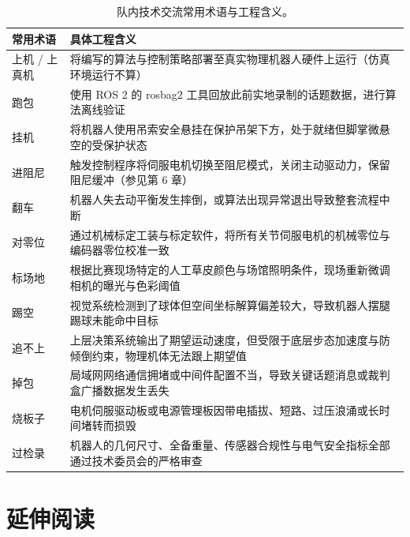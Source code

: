 \begin{table}[H]
\centering
\small
\begin{tabularx}{\textwidth}{p{2.6cm} X}
\toprule
\textbf{常用术语} & \textbf{具体工程含义} \\
\midrule
上机 / 上真机 & 将编写的算法与控制策略部署至真实物理机器人硬件上运行（仿真环境运行不算） \\
\addlinespace
跑包 & 使用 ROS 2 的 rosbag2 工具回放此前实地录制的话题数据，进行算法离线验证 \\
\addlinespace
挂机 & 将机器人使用吊索安全悬挂在保护吊架下方，处于就绪但脚掌微悬空的受保护状态 \\
\addlinespace
进阻尼 & 触发控制程序将伺服电机切换至阻尼模式，关闭主动驱动力，保留阻尼缓冲（参见第 6 章） \\
\addlinespace
翻车 & 机器人失去动平衡发生摔倒，或算法出现异常退出导致整套流程中断 \\
\addlinespace
对零位 & 通过机械标定工装与标定软件，将所有关节伺服电机的机械零位与编码器零位校准一致 \\
\addlinespace
标场地 & 根据比赛现场特定的人工草皮颜色与场馆照明条件，现场重新微调相机的曝光与色彩阈值 \\
\addlinespace
踢空 & 视觉系统检测到了球体但空间坐标解算偏差较大，导致机器人摆腿踢球未能命中目标 \\
\addlinespace
追不上 & 上层决策系统输出了期望运动速度，但受限于底层步态加速度与防倾倒约束，物理机体无法跟上期望值 \\
\addlinespace
掉包 & 局域网网络通信拥堵或中间件配置不当，导致关键话题消息或裁判盒广播数据发生丢失 \\
\addlinespace
烧板子 & 电机伺服驱动板或电源管理板因带电插拔、短路、过压浪涌或长时间堵转而损毁 \\
\addlinespace
过检录 & 机器人的几何尺寸、全备重量、传感器合规性与电气安全指标全部通过技术委员会的严格审查 \\
\bottomrule
\end{tabularx}
\caption{队内技术交流常用术语与工程含义。}
\end{table}

\section{延伸阅读}

